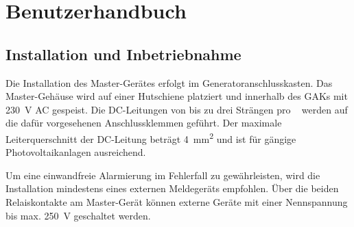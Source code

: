 \chapter{Benutzerhandbuch}
\label{chap:userguide}

\noindent{}
\noindent{}

\section{Installation und Inbetriebnahme}
\label{sec:userguide:installation}

Die Installation des Master-Ger\"ates erfolgt im Generatoranschlusskasten. Das
Master-Geh\"ause  wird  auf  einer  Hutschiene  platziert  und  innerhalb  des
GAKs  mit  \SI{230}{\volt}  AC  gespeist. Die DC-Leitungen  von  bis  zu  drei
Str\"angen pro  \Master~ werden auf die  daf\"ur vorgesehenen Anschlussklemmen
gef\"uhrt. Der   maximale    Leiterquerschnitt   der    DC-Leitung   betr\"agt
\SI{4}{\milli\meter\squared}  und  ist   f\"ur  g\"angige  Photovoltaikanlagen
ausreichend.

Um eine  einwandfreie Alarmierung im  Fehlerfall zu gew\"ahrleisten,  wird die
Installation  mindestens eines  externen  Meldeger\"ats empfohlen. \"Uber  die
beiden Relaiskontakte  am Master-Ger\"at  k\"onnen externe Ger\"ate  mit einer
Nennspannung bis max. \SI{250}{\volt} geschaltet werden.

